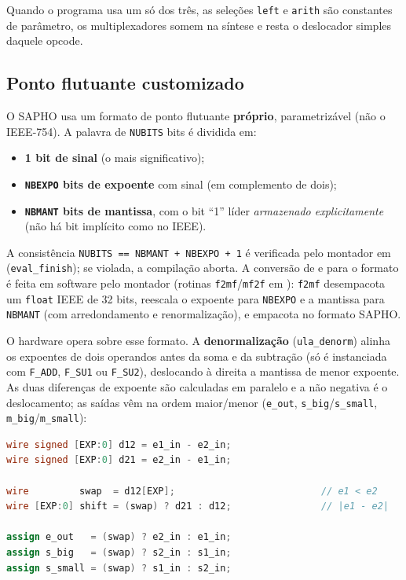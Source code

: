 Quando o programa usa um só dos três, as seleções \lstinline|left| e \lstinline|arith| são
constantes de parâmetro, os multiplexadores somem na síntese e resta o deslocador simples
daquele opcode.

\subsection{Ponto flutuante customizado}
\label{sec:arq-ula-float}

O SAPHO usa um formato de ponto flutuante \textbf{próprio}, parametrizável (não o IEEE-754).
A palavra de \lstinline|NUBITS| bits é dividida em:

\begin{itemize}[leftmargin=1.6em]
  \item \textbf{1 bit de sinal} (o mais significativo);
  \item \textbf{\lstinline|NBEXPO| bits de expoente} com sinal (em complemento de dois);
  \item \textbf{\lstinline|NBMANT| bits de mantissa}, com o bit ``1'' líder
    \emph{armazenado explicitamente} (não há bit implícito como no IEEE).
\end{itemize}

A consistência \lstinline|NUBITS == NBMANT + NBEXPO + 1| é verificada pelo montador em
 (\lstinline|eval_finish|); se violada, a compilação aborta. A conversão de e
para o formato é feita em software pelo montador (rotinas \lstinline|f2mf|/\lstinline|mf2f|
em ): \lstinline|f2mf| desempacota um \lstinline|float| IEEE de 32 bits, reescala
o expoente para \lstinline|NBEXPO| e a mantissa para \lstinline|NBMANT| (com arredondamento e
renormalização), e empacota no formato SAPHO.

O hardware opera sobre esse formato. A \textbf{denormalização} (\lstinline|ula_denorm|)
alinha os expoentes de dois operandos antes da soma e da subtração (só é instanciada com
\lstinline|F_ADD|, \lstinline|F_SU1| ou \lstinline|F_SU2|), deslocando à direita a mantissa
de menor expoente. As duas diferenças de expoente são calculadas em paralelo e a não
negativa é o deslocamento; as saídas vêm na ordem maior/menor (\lstinline|e_out|,
\lstinline|s_big|/\lstinline|s_small|, \lstinline|m_big|/\lstinline|m_small|):

\begin{lstlisting}[language=Verilog]
wire signed [EXP:0] d12 = e1_in - e2_in;
wire signed [EXP:0] d21 = e2_in - e1_in;

wire         swap  = d12[EXP];                          // e1 < e2
wire [EXP:0] shift = (swap) ? d21 : d12;                // |e1 - e2|

assign e_out   = (swap) ? e2_in : e1_in;
assign s_big   = (swap) ? s2_in : s1_in;
assign s_small = (swap) ? s1_in : s2_in;
\end{lstlisting}

